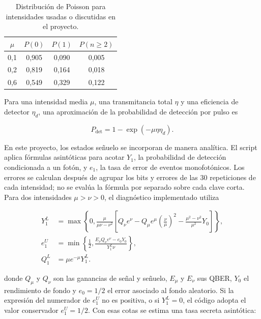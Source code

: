 \begin{table}[H]
  \centering
  \begin{tabular}{c c c c}
    \toprule
    \(\mu\) & \(P(0)\) & \(P(1)\) & \(P(n\geq2)\) \\
    \midrule
    0,1 & 0,905 & 0,090 & 0,005 \\
    0,2 & 0,819 & 0,164 & 0,018 \\
    0,6 & 0,549 & 0,329 & 0,122 \\
    \bottomrule
  \end{tabular}
  \caption{Distribución de Poisson para intensidades usadas o discutidas en el proyecto.}
  \label{tab:poisson_mu}
\end{table}

Para una intensidad media \(\mu\), una transmitancia total \(\eta\) y una eficiencia de detector \(\eta_d\), una aproximación de la probabilidad de detección por pulso es

\begin{equation}
  P_\text{det} = 1 - \exp(-\mu \eta \eta_d).
  \label{eq:pdet}
\end{equation}

En este proyecto, los estados señuelo se incorporan de manera analítica. El script aplica fórmulas asintóticas para acotar \(Y_1\), la probabilidad de detección condicionada a un fotón, y \(e_1\), la tasa de error de eventos monofotónicos. Los errores se calculan después de agrupar los bits y errores de las 30 repeticiones de cada intensidad; no se evalúa la fórmula por separado sobre cada clave corta. Para dos intensidades \(\mu>\nu>0\), el diagnóstico implementado utiliza \cite{maQiZhaoLo2005}

\begin{align}
  Y_1^L &= \max\!\left\{0,
  \frac{\mu}{\mu\nu-\nu^2}
  \left[
    Q_\nu e^\nu
    -Q_\mu e^\mu\left(\frac{\nu}{\mu}\right)^2
    -\frac{\mu^2-\nu^2}{\mu^2}Y_0
  \right]\right\},
  \label{eq:y1_decoy}\\
  e_1^U &= \min\!\left\{\frac{1}{2},
  \frac{E_\nu Q_\nu e^\nu-e_0Y_0}{Y_1^L\nu}
  \right\},
  \label{eq:e1_decoy}\\
  Q_1^L &= \mu e^{-\mu}Y_1^L.
  \label{eq:q1_decoy}
\end{align}

donde \(Q_\mu\) y \(Q_\nu\) son las ganancias de señal y señuelo, \(E_\mu\) y \(E_\nu\) sus QBER, \(Y_0\) el rendimiento de fondo y \(e_0=1/2\) el error asociado al fondo aleatorio. Si la expresión del numerador de \(e_1^U\) no es positiva, o si \(Y_1^L=0\), el código adopta el valor conservador \(e_1^U=1/2\). Con esas cotas se estima una tasa secreta asintótica:

